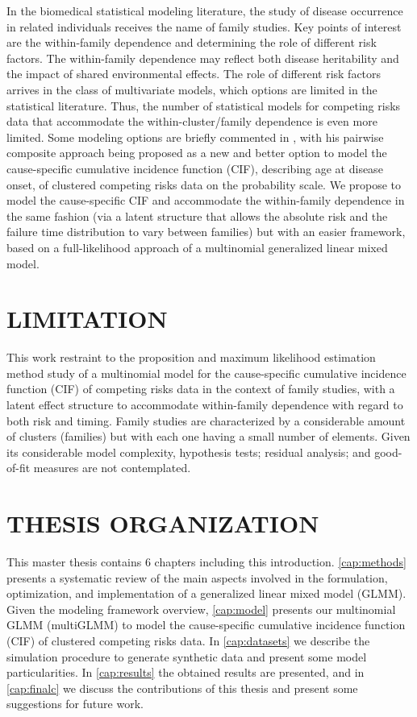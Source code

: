 In the biomedical statistical modeling literature, the study of disease
occurrence in related individuals receives the name of family studies.
Key points of interest are the within-family dependence and determining
the role of different risk factors. The within-family dependence may
reflect both disease heritability and the impact of shared environmental
effects. The role of different risk factors arrives in the class of
multivariate models, which options are limited in the statistical
literature. Thus, the number of statistical models for competing risks
data that accommodate the within-cluster/family dependence is even more
limited. Some modeling options are briefly commented in
, with his pairwise composite approach being
proposed as a new and better option to model the cause-specific
cumulative incidence function (CIF), describing age at disease onset, of
clustered competing risks data on the probability scale. We propose to
model the cause-specific CIF and accommodate the within-family
dependence in the same fashion (via a latent structure that allows the
absolute risk and the failure time distribution to vary between
families) but with an easier framework, based on a full-likelihood
approach of a multinomial generalized linear mixed model.

\section{LIMITATION}

This work restraint to the proposition and maximum likelihood estimation
method study of a multinomial model for the cause-specific cumulative
incidence function (CIF) of competing risks data in the context of
family studies, with a latent effect structure to accommodate
within-family dependence with regard to both risk and timing. Family
studies are characterized by a considerable amount of clusters
(families) but with each one having a small number of elements. Given
its considerable model complexity, hypothesis tests; residual analysis;
and good-of-fit measures are not contemplated.

\section{THESIS ORGANIZATION}

This master thesis contains 6 chapters including this introduction.
\autoref{cap:methods} presents a systematic review of the main aspects
involved in the formulation, optimization, and implementation of a
generalized linear mixed model (GLMM). Given the modeling framework
overview, \autoref{cap:model} presents our multinomial GLMM (multiGLMM)
to model the cause-specific cumulative incidence function (CIF) of
clustered competing risks data. In \autoref{cap:datasets} we describe
the simulation procedure to generate synthetic data and present some
model particularities. In \autoref{cap:results} the obtained results are
presented, and in \autoref{cap:finalc} we discuss the contributions of
this thesis and present some suggestions for future work.

